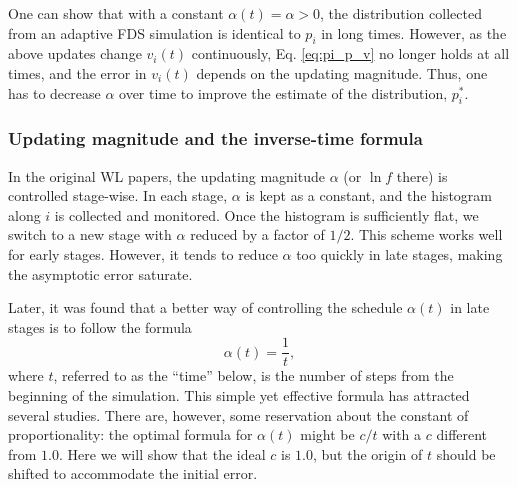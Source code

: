 \documentclass[reprint, floatfix]{revtex4-1}
\begin{document}
One can show that with a constant $\alpha(t) = \alpha > 0$,
the distribution collected from
an adaptive FDS simulation
is identical to $p_i$ in long times.
%
However, as the above updates
change $v_i(t)$ continuously,
Eq. \eqref{eq:pi_p_v} no longer holds
at all times,
and the error in $v_i(t)$
depends on the updating magnitude\cite{
  zhou2005, liang2005, laio2005, bussi2006, poulain2006, liang2007,
  morozov2007, zhou2008, morozov2009, crespo2010,
  atchade2011, fort2015}.
%
Thus, one has to decrease $\alpha$ over time
to improve the estimate of the distribution,
$p^*_i$. %





\subsubsection{Updating magnitude and the inverse-time formula}



In the original WL papers\cite{
wang2001, wang2001pre},
the updating magnitude $\alpha$
(or $\ln f$ there)
is controlled stage-wise.
%
In each stage, $\alpha$
is kept as a constant,
and the histogram along $i$
is collected and monitored.
%
Once the histogram is sufficiently flat,
we switch to a new stage
with $\alpha$ reduced by a factor of $1/2$\cite{
wang2001, wang2001pre}.
%
This scheme works well for early stages.
%
However, it tends to reduce $\alpha$
too quickly in late stages, making the asymptotic error
saturate\cite{belardinelli2007, belardinelli2007jcp, belardinelli2008}.


Later,
it was found that
a better way
of controlling the schedule $\alpha(t)$
in late stages
is to follow the formula
%
\begin{equation}
  \alpha(t) = \frac{1}{t},
  \label{eq:alpha_invt}
\end{equation}
%
where $t$,
referred to as the ``time'' below,
is the number of steps
from the beginning of the simulation.
%
This simple yet effective formula has attracted
several studies\cite{belardinelli2007, belardinelli2007jcp, belardinelli2008,
morozov2007, zhou2008, morozov2009,
komura2012, caparica2012, caparica2014}.
%
There are, however, some reservation about
the constant of proportionality:
the optimal formula for $\alpha(t)$
might be $c/t$ with a $c$
different from $1.0$\cite{
morozov2007, zhou2008, morozov2009}.
%
Here we will show that the ideal $c$
is $1.0$, but the origin of $t$ should be shifted
to accommodate the initial error.
\end{document}

